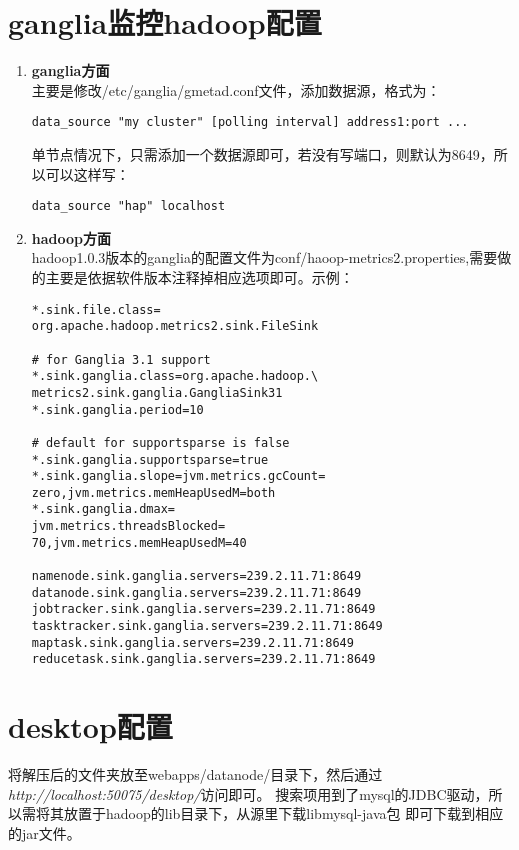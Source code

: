 \documentclass[11pt]{article}
\begin{document}
\section{ganglia监控hadoop配置}
\begin{enumerate}
\item{\textbf{ganglia方面}} \\
主要是修改/etc/ganglia/gmetad.conf文件，添加数据源，格式为：
\begin{lstlisting}
data_source "my cluster" [polling interval] address1:port ...
\end{lstlisting}
单节点情况下，只需添加一个数据源即可，若没有写端口，则默认为8649，所以可以这样写：
\begin{lstlisting}
data_source "hap" localhost
\end{lstlisting}
\item{\textbf{hadoop方面}} \\
hadoop1.0.3版本的ganglia的配置文件为conf/haoop-metrics2.properties,需要做的主要是依据软件版本注释掉相应选项即可。示例：\newpage
\begin{lstlisting}[frame=shadowbox]
*.sink.file.class=
org.apache.hadoop.metrics2.sink.FileSink

# for Ganglia 3.1 support
*.sink.ganglia.class=org.apache.hadoop.\
metrics2.sink.ganglia.GangliaSink31
*.sink.ganglia.period=10

# default for supportsparse is false
*.sink.ganglia.supportsparse=true
*.sink.ganglia.slope=jvm.metrics.gcCount= 
zero,jvm.metrics.memHeapUsedM=both
*.sink.ganglia.dmax=
jvm.metrics.threadsBlocked=
70,jvm.metrics.memHeapUsedM=40

namenode.sink.ganglia.servers=239.2.11.71:8649
datanode.sink.ganglia.servers=239.2.11.71:8649
jobtracker.sink.ganglia.servers=239.2.11.71:8649
tasktracker.sink.ganglia.servers=239.2.11.71:8649
maptask.sink.ganglia.servers=239.2.11.71:8649
reducetask.sink.ganglia.servers=239.2.11.71:8649
\end{lstlisting}

\end{enumerate}

\section{desktop配置}
将解压后的文件夹放至webapps/datanode/目录下，然后通过 \\
\textit{http://localhost:50075/desktop/}访问即可。
搜索项用到了mysql的JDBC驱动，所以需将其放置于hadoop的lib目录下，从源里下载libmysql-java包
即可下载到相应的jar文件。
\end{document}
